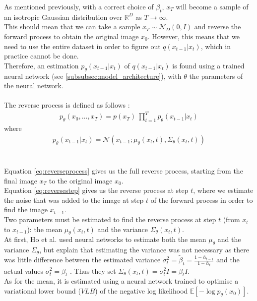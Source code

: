 \documentclass[twoside]{article}
\numberwithin{equation}{section}
\numberwithin{figure}{section}
\begin{document}
As mentioned previously, with a correct choice of $\beta_t$, $x_T$ will become a sample of an isotropic Gaussian distribution over $\mathbb{R}^D$ as $T \rightarrow \infty$. \cite{nichol2021improved, sohldickstein2015deep} \\
This should mean that we can take a sample $x_T \sim \mathcal{N}_D \left(0, I\right)$ and reverse the forward process to obtain the original image $x_0$. 
However, this means that we need to use the entire dataset in order to figure out $q\left(x_{t-1} | x_t\right)$, which in practice cannot be done. \cite{nichol2021improved} \\
Therefore, an estimation $p_\theta (x_{t-1} | x_t)$ of $q(x_{t-1}|x_t)$ is found using a trained neural network (see \ref{subsubsec:model_architecture}), with $\theta$ the parameters of the neural network. \cite{nichol2021improved}
\\\\
The reverse process is defined as follows \cite{ho2020denoising}:
\begin{gather}
  p_{\theta}\left(x_0, ..., x_T\right) = p\left(x_T\right) \: \prod_{t=1}^T p_{\theta}\left(x_{t-1} | x_t\right) \label{eq:reverseprocess}
\end{gather}
where
\begin{gather}
  p_{\theta}\left(x_{t-1} | x_t\right) = \mathcal{N}\left(x_{t-1}; \mu_{\theta}\left(x_t, t\right), \Sigma_{\theta}\left(x_t, t\right)\right) \label{eq:reversestep}
\end{gather}
\\\\
Equation \ref{eq:reverseprocess} gives us the full reverse process, starting from the final image $x_T$ to the original image $x_0$. \\
Equation \ref{eq:reversestep} gives us the reverse process at step $t$, where we estimate the noise that was added to the image at step $t$ of the forward process in order to find the image $x_{t-1}$. \\
Two parameters must be estimated to find the reverse process at step $t$ (from $x_t$ to $x_{t-1}$): the mean $\mu_{\theta}\left(x_t, t\right)$ and the variance $\Sigma_{\theta}\left(x_t, t\right)$. \\
At first, Ho et al. \cite{ho2020denoising} used neural networks to estimate both the mean $\mu_\theta$ and the variance $\Sigma_\theta$, but explain that estimating the variance was not necessary as there was little difference between the estimated variance $\sigma_t^2 = \tilde{\beta}_t = \frac{1 - \bar{\alpha}_{t-1}}{1 - \bar{\alpha}_t}$ and the actual values $\sigma_t^2 = \beta_t$ \cite{ho2020denoising}. Thus they set $\Sigma_{\theta}\left(x_t, t\right) = \sigma_t^2 I = \beta_t I$. \\
As for the mean, it is estimated using a neural network trained to optimise a variational lower bound ($VLB$) of the negative log likelihood $\mathbb{E}\left[- \log p_{\theta} \left(x_0\right)\right]$. \cite{ho2020denoising}
\end{document}
